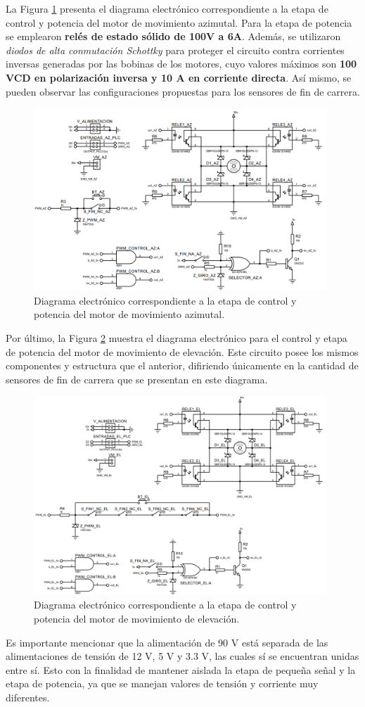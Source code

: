 La Figura \ref{fig:Cto_AZ} presenta el diagrama electrónico correspondiente a la etapa de control y potencia del motor de movimiento azimutal. Para la etapa de potencia se emplearon \textbf{relés de estado sólido de 100V a 6A}. Además, se utilizaron \textit{diodos de alta conmutación Schottky} para proteger el circuito contra corrientes inversas generadas por las bobinas de los motores, cuyo valores máximos son \textbf{100 VCD en polarización inversa y 10 A en corriente directa}. Así mismo, se pueden observar las configuraciones propuestas para los sensores de fin de carrera.
\begin{figure}[H]
	\centering
	\includegraphics[width=11cm]{imagenes/Circuito_AZ}
	\caption{Diagrama electrónico correspondiente a la etapa de control y potencia del motor de movimiento azimutal.}
	\label{fig:Cto_AZ}
\end{figure}

Por último, la Figura \ref{fig:Cto_EL} muestra el diagrama electrónico para el control y etapa de potencia del motor de movimiento de elevación. Este circuito posee los mismos componentes y estructura que el anterior, difiriendo únicamente en la cantidad de sensores de fin de carrera que se presentan en este diagrama.
\begin{figure}[H]
	\centering
	\includegraphics[width=11cm]{imagenes/circuito_EL}
	\caption{Diagrama electrónico correspondiente a la etapa de control y potencia del motor de movimiento de elevación.}
	\label{fig:Cto_EL}
\end{figure}
Es importante mencionar que la alimentación de 90 V está separada de las alimentaciones de tensión de 12 V, 5 V y 3.3 V, las cuales sí se encuentran unidas entre sí. Esto con la finalidad de mantener aislada la etapa de pequeña señal y la etapa de potencia, ya que se manejan valores de tensión y corriente muy diferentes.

